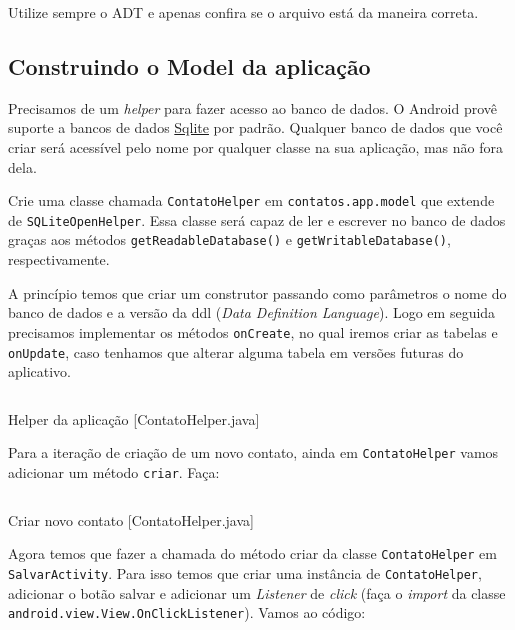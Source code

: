 Utilize sempre o ADT e apenas confira se o arquivo está da maneira
correta.

\subsection{Construindo o Model da aplicação \label{ssec:model}}

Precisamos de um \emph{helper} para fazer acesso ao banco de dados. O
Android provê suporte a bancos de dados
\href{http://sqlite.org/}{Sqlite} por padrão. Qualquer banco de dados
que você criar será acessível pelo nome por qualquer classe na sua
aplicação, mas não fora dela.

Crie uma classe chamada \texttt{ContatoHelper} em
\texttt{contatos.app.model} que extende de \texttt{SQLiteOpenHelper}.
Essa classe será capaz de ler e escrever no banco de dados graças aos
métodos \texttt{getReadableDatabase()} e \texttt{getWritableDatabase()},
respectivamente.

A princípio temos que criar um construtor passando como parâmetros o
nome do banco de dados e a versão da \gls{ddl} (\emph{Data Definition
Language}). Logo em seguida precisamos implementar os métodos
\texttt{onCreate}, no qual iremos criar as tabelas e \texttt{onUpdate},
caso tenhamos que alterar alguma tabela em versões futuras do
aplicativo.

\begin{listing}[H]
  \inputminted[linenos=true,frame=bottomline,tabsize=3]{ java }{ source/ContatoHelper-1.java }
  \caption{Helper da aplicação [ContatoHelper.java]}
\end{listing}

Para a iteração de criação de um novo contato, ainda em
\texttt{ContatoHelper} vamos adicionar um método \texttt{criar}. Faça:

\begin{listing}[H]
  \inputminted[linenos=true,frame=bottomline,tabsize=3]{ java }{ source/ContatoHelper-2.java }
  \caption{Criar novo contato [ContatoHelper.java]}
\end{listing}

Agora temos que fazer a chamada do método criar da classe
\texttt{ContatoHelper} em \texttt{SalvarActivity}. Para isso temos que
criar uma instância de \texttt{ContatoHelper}, adicionar o botão salvar
e adicionar um \emph{Listener} de \emph{click} (faça o \emph{import} da
classe \newline
\texttt{android.view.View.OnClickListener}). Vamos ao código:

